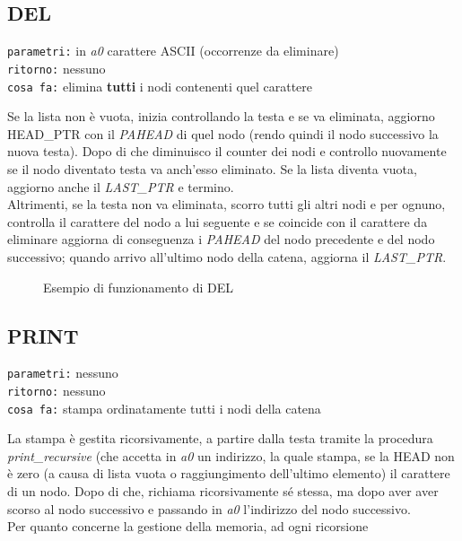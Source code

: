 \documentclass[11pt]{report}
\begin{document}
    \subsection{DEL}
    \begin{mdframed}
        \texttt{parametri:} in \textit{a0} carattere ASCII (occorrenze da eliminare) \\
         \texttt{ritorno:} nessuno \\
         \texttt{cosa fa:} elimina \textbf{tutti} i nodi contenenti quel carattere
    \end{mdframed}
    Se la lista non è vuota, inizia controllando la testa e se va eliminata, aggiorno HEAD\_PTR con il \textit{PAHEAD} di quel nodo (rendo quindi il nodo successivo la nuova testa). Dopo di che diminuisco il counter dei nodi e controllo nuovamente se il nodo diventato testa va anch'esso eliminato. Se la lista diventa vuota, aggiorno anche il \textit{LAST\_PTR} e termino.\\
    Altrimenti, se la testa non va eliminata, scorro tutti gli altri nodi e per ognuno, controlla il carattere del nodo a lui seguente e se coincide con il carattere da eliminare aggiorna di conseguenza i \textit{PAHEAD} del nodo precedente e del nodo successivo; quando arrivo all'ultimo nodo della catena, aggiorna il \textit{LAST\_PTR}.
    
    \begin{figure}[H]
            \centering
            
            \caption{Esempio di funzionamento di DEL}
            \label{fig}
    \end{figure}


    \subsection{PRINT}
    \begin{mdframed}
        \texttt{parametri:} nessuno \\
         \texttt{ritorno:} nessuno \\
         \texttt{cosa fa:} stampa ordinatamente tutti i nodi della catena
    \end{mdframed}

    La stampa è gestita ricorsivamente, a partire dalla testa tramite la procedura \textit{print\_recursive} (che accetta in \textit{a0} un indirizzo, la quale stampa, se la HEAD non è zero (a causa di lista vuota o raggiungimento dell'ultimo elemento) il carattere di un nodo. Dopo di che, richiama ricorsivamente sé stessa, ma dopo aver aver scorso al nodo successivo e passando in \textit{a0} l'indirizzo del nodo successivo.\\
    Per quanto concerne la gestione della memoria, ad ogni ricorsione
    
    
    
    
\end{document}
